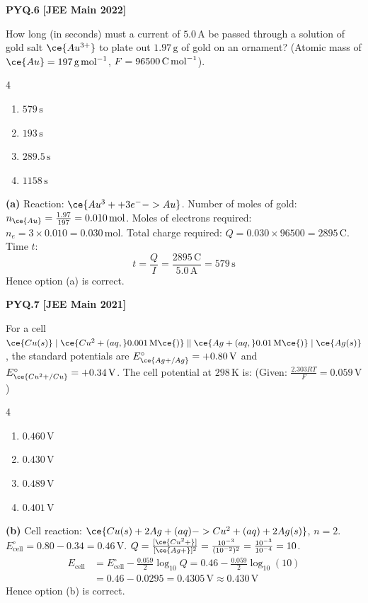 \begin{problembox}
\textbf{PYQ.6} \hfill \textbf{[JEE Main 2022]}

How long (in seconds) must a current of $5.0\,\text{A}$ be passed through a solution of gold salt $\ce{Au^{3+}}$ to plate out $1.97\,\text{g}$ of gold on an ornament? (Atomic mass of $\ce{Au} = 197\,\text{g\,mol}^{-1}$, $F = 96500\,\text{C\,mol}^{-1}$).
\begin{multicols}{4}
\begin{enumerate}[label=(\alph*)]
    \item $579\,\text{s}$
    \item $193\,\text{s}$
    \item $289.5\,\text{s}$
    \item $1158\,\text{s}$
\end{enumerate}
\end{multicols}
\end{problembox}
\begin{solution}
\textbf{(a)}
Reaction: $\ce{Au^3+ + 3e^- -> Au}$.
Number of moles of gold: $n_{\ce{Au}} = \frac{1.97}{197} = 0.010\,\text{mol}$.
Moles of electrons required: $n_e = 3 \times 0.010 = 0.030\,\text{mol}$.
Total charge required: $Q = 0.030 \times 96500 = 2895\,\text{C}$.
Time $t$:
\begin{equation*}
    t = \frac{Q}{I} = \frac{2895\,\text{C}}{5.0\,\text{A}} = 579\,\text{s}
\end{equation*}
Hence option (a) is correct.
\end{solution}

\begin{problembox}
\textbf{PYQ.7} \hfill \textbf{[JEE Main 2021]}

For a cell $\ce{Cu(s)} \mid \ce{Cu^2+(aq, } 0.001\,\text{M}\ce{)} \parallel \ce{Ag+(aq, } 0.01\,\text{M}\ce{)} \mid \ce{Ag(s)}$, the standard potentials are $E^\circ_{\ce{Ag+/Ag}} = +0.80\,\text{V}$ and $E^\circ_{\ce{Cu^2+/Cu}} = +0.34\,\text{V}$. The cell potential at $298\,\text{K}$ is: (Given: $\frac{2.303 RT}{F} = 0.059\,\text{V}$)
\begin{multicols}{4}
\begin{enumerate}[label=(\alph*)]
    \item $0.460\,\text{V}$
    \item $0.430\,\text{V}$
    \item $0.489\,\text{V}$
    \item $0.401\,\text{V}$
\end{enumerate}
\end{multicols}
\end{problembox}
\begin{solution}
\textbf{(b)}
Cell reaction: $\ce{Cu(s) + 2Ag+(aq) -> Cu^2+(aq) + 2Ag(s)}$, $n = 2$.
$E^\circ_{\text{cell}} = 0.80 - 0.34 = 0.46\,\text{V}$.
$Q = \frac{[\ce{Cu^2+}]}{[\ce{Ag+}]^2} = \frac{10^{-3}}{(10^{-2})^2} = \frac{10^{-3}}{10^{-4}} = 10$.
\begin{align*}
    E_{\text{cell}} &= E^\circ_{\text{cell}} - \frac{0.059}{2}\log_{10} Q = 0.46 - \frac{0.059}{2} \log_{10}(10) \\
    &= 0.46 - 0.0295 = 0.4305\,\text{V} \approx 0.430\,\text{V}
\end{align*}
Hence option (b) is correct.
\end{solution}
